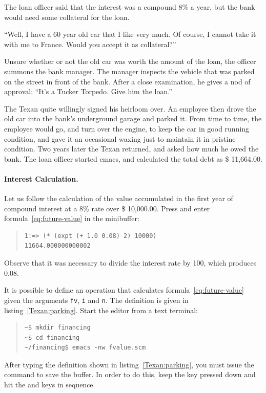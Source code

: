 \documentclass[a4paper,12pt]{book}
\begin{document}
The loan officer said that the interest was a compound 8\%
a year, but the bank would need some collateral for the loan.

“Well, I have a 60 year old car that I like very much.
Of course, I cannot take it with me to France.
Would you accept it as collateral?”

Unsure whether or not the old car was worth the
amount of the loan, the officer summons the bank manager.
The manager inspects the vehicle that was parked on the
street in front of the bank. After a close examination,
he gives a nod of approval: “It’s a Tucker Torpedo.
Give him the loan.”

The Texan quite willingly signed his heirloom over.
An employee then drove the old car into the bank’s
underground garage and parked it. From time to time,
the employee would go, and turn over the engine, to keep
the car in good running condition, and gave it an
occasional waxing just to maintain it in pristine condition.
Two years later the Texan returned, and asked how
much he owed the bank. The loan officer started emacs,
and calculated the total debt as \$ 11,664.00.

\paragraph{Interest Calculation.}
Let us follow the calculation of the value accumulated
in the first year of compound interest at a 8\% rate
over \$ 10,000.00. Press  and
enter formula~\ref{eq:future-value} in the minibuffer:
\begin{quote}
\begin{verbatim}
1:=> (* (expt (+ 1.0 0.08) 2) 10000)
11664.000000000002
\end{verbatim}
\end{quote}
Observe that it was necessary to divide the
interest rate by 100, which produces 0.08.

It is possible to define an operation that
calculates formula~\ref{eq:future-value}
given the arguments \verb|fv|, \verb|i|
and \verb|n|. The definition is given
in listing~\ref{Texan:parking}.
Start the editor from a text terminal:
\begin{quote}
\begin{verbatim}
~$ mkdir financing
~$ cd financing
~/financing$ emacs -nw fvalue.scm
\end{verbatim}
\end{quote}
After typing the definition shown
in listing~\ref{Texan:parking},
you must issue the 
command to save the buffer.
In order to do this, keep the
 key pressed down and
hit the  and
 keys in sequence.
\end{document}
